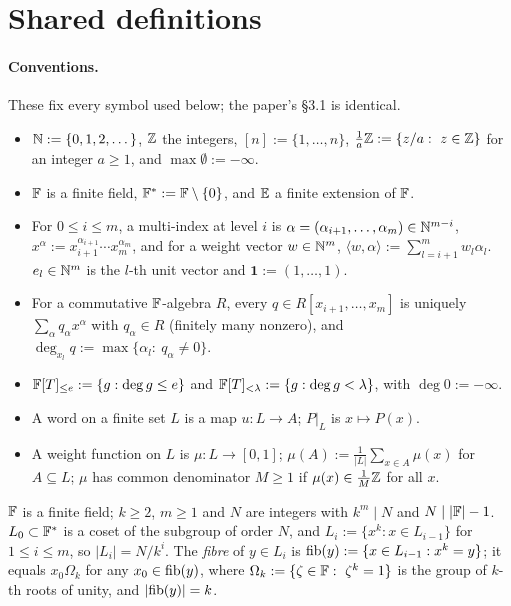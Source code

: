 \section{Shared definitions}

\paragraph{Conventions.} These fix every symbol used below; the paper's \S3.1 is identical.
\begin{itemize}
\item $\mathbb{N}:=\{0,1,2,\dots\}$, $\mathbb{Z}$ the integers, $[n]:=\{1,\dots,n\}$,
$\frac1a\mathbb{Z}:=\{z/a:\ z\in\mathbb{Z}\}$ for an integer $a\ge1$, and $\max\emptyset:=-\infty$.
\item $\mathbb{F}$ is a finite field, $\mathbb{F}^*:=\mathbb{F}\setminus\{0\}$, and $\mathbb{E}$ a finite extension of $\mathbb{F}$.
\item For $0\le i\le m$, a multi-index at level $i$ is $\alpha=(\alpha_{i+1},\dots,\alpha_m)\in\mathbb{N}^{m-i}$,
$x^\alpha:=x_{i+1}^{\alpha_{i+1}}\cdots x_m^{\alpha_m}$, and for a weight vector $w\in\mathbb{N}^m$,
$\langle w,\alpha\rangle:=\sum_{l=i+1}^mw_l\alpha_l$. $e_l\in\mathbb{N}^m$ is the $l$-th unit vector and
$\mathbf 1:=(1,\dots,1)$.
\item For a commutative $\mathbb{F}$-algebra $R$, every $q\in R[x_{i+1},\dots,x_m]$ is uniquely
$\sum_\alpha q_\alpha x^\alpha$ with $q_\alpha\in R$ (finitely many nonzero), and
$\deg_{x_l}q:=\max\{\alpha_l:\ q_\alpha\ne0\}$.
\item $\mathbb{F}[T]_{\le e}:=\{g:\deg g\le e\}$ and $\mathbb{F}[T]_{<\lambda}:=\{g:\deg g<\lambda\}$, with $\deg0:=-\infty$.
\item A word on a finite set $L$ is a map $u:L\to A$; $P|_L$ is $x\mapsto P(x)$.
\item A weight function on $L$ is $\mu:L\to[0,1]$; $\mu(A):=\frac1{|L|}\sum_{x\in A}\mu(x)$ for
$A\subseteq L$; $\mu$ has common denominator $M\ge1$ if $\mu(x)\in\frac1M\mathbb{Z}$ for all $x$.
\end{itemize}

\begin{definition}\label{def:domains}
$\mathbb{F}$ is a finite field; $k\ge 2$, $m\ge 1$ and $N$ are integers with $k^m\mid N$ and
$N\mid |\mathbb{F}|-1$. $L_0\subset\mathbb{F}^*$ is a coset of the subgroup of order $N$, and
$L_i:=\{x^k: x\in L_{i-1}\}$ for $1\le i\le m$, so $|L_i|=N/k^i$. The \emph{fibre} of
$y\in L_i$ is $\mathrm{fib}(y):=\{x\in L_{i-1}: x^k=y\}$; it equals $x_0\Omega_k$ for any
$x_0\in\mathrm{fib}(y)$, where $\Omega_k:=\{\zeta\in\mathbb{F}:\ \zeta^k=1\}$ is the group of $k$-th roots of unity, and $|\mathrm{fib}(y)|=k$.
\end{definition}

